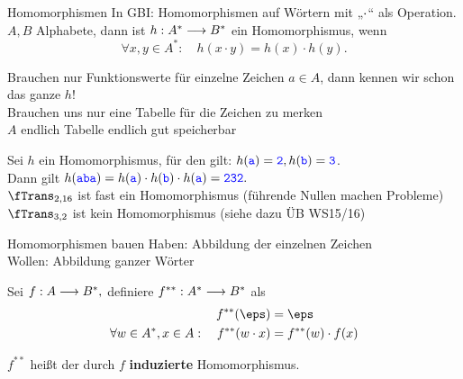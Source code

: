 \begin{frame}{Homomorphismen}
	In GBI: Homomorphismen auf Wörtern mit „$\cdot$“ als Operation.\\
	\impl $A, B$ Alphabete, dann ist $h: A^* \longrightarrow B^*$ ein Homomorphismus, wenn
	$$ \forall x, y \in A^* : \quad h(x \cdot y) = h(x) \cdot h(y). $$
	
	\pause
	\impl Brauchen nur Funktionswerte für einzelne Zeichen $a \in A$, dann kennen wir schon das ganze $h$! \\
	\impl Brauchen uns nur eine Tabelle für die Zeichen zu merken \\
	\impl $A$ endlich \impl Tabelle endlich \impl gut speicherbar
	
	\pause
	\begin{Beispiel}
		Sei $h$ ein Homomorphismus, für den gilt: $h(\hbox{\textcolor{blue}{\texttt{a}}}) = \hbox{\textcolor{blue}{\texttt{2}}}, h(\hbox{\textcolor{blue}{\texttt{b}}}) = \hbox{\textcolor{blue}{\texttt{3}}}$. \\
		Dann gilt $h(\hbox{\textcolor{blue}{\texttt{aba}}}) = h(\hbox{\textcolor{blue}{\texttt{a}}}) \cdot h(\hbox{\textcolor{blue}{\texttt{b}}}) \cdot h(\hbox{\textcolor{blue}{\texttt{a}}}) = \hbox{\textcolor{blue}{\texttt{232}}}. $ \\[0.5em]
		\pause
		$\fTrans_{2,16}$ ist fast ein Homomorphismus (führende Nullen machen Probleme)\\
		$\fTrans_{3,2}$ ist kein Homomorphismus (siehe dazu ÜB WS15/16)
	\end{Beispiel}
\end{frame}

\begin{frame}{Homomorphismen bauen}
	Haben: Abbildung der einzelnen Zeichen \\
	Wollen: Abbildung ganzer Wörter 
	\begin{Definition}
		Sei $f: A \longrightarrow B^*,$ \pause definiere $f^{**}:A^* \longrightarrow B^*$ als
		\begin{align*}
		f^{**}(\eps) &= \eps  \\
		\forall w\in A^*, x\in A: \quad  f^{**}(w \* x) &= f^{**}(w) \* f(x)       
		\end{align*}
	\end{Definition}

	$f^{**}$ heißt der durch $f$ \textbf{induzierte} Homomorphismus.
\end{frame}

